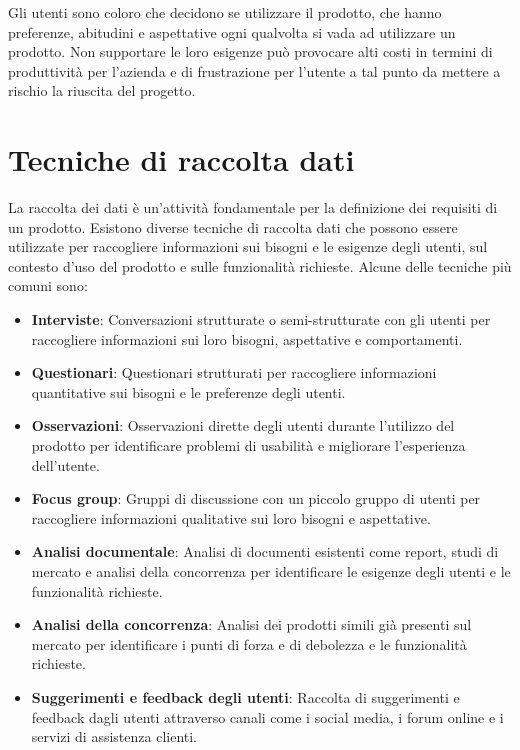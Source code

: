 \documentclass{report}
\begin{document}
	Gli utenti sono coloro che decidono se utilizzare il prodotto, che hanno preferenze, abitudini e aspettative ogni qualvolta si vada ad utilizzare un prodotto. Non supportare le loro esigenze può provocare alti costi in termini di produttività per l'azienda e di frustrazione per l'utente a tal punto da mettere a rischio la riuscita del progetto.

	\section{Tecniche di raccolta dati}
	La raccolta dei dati è un'attività fondamentale per la definizione dei requisiti di un prodotto. Esistono diverse tecniche di raccolta dati che possono essere utilizzate per raccogliere informazioni sui bisogni e le esigenze degli utenti, sul contesto d'uso del prodotto e sulle funzionalità richieste. Alcune delle tecniche più comuni sono:
	\begin{itemize}
		\item \textbf{Interviste}: Conversazioni strutturate o semi-strutturate con gli utenti per raccogliere informazioni sui loro bisogni, aspettative e comportamenti.
		\item \textbf{Questionari}: Questionari strutturati per raccogliere informazioni quantitative sui bisogni e le preferenze degli utenti.
		\item \textbf{Osservazioni}: Osservazioni dirette degli utenti durante l'utilizzo del prodotto per identificare problemi di usabilità e migliorare l'esperienza dell'utente.
		\item \textbf{Focus group}: Gruppi di discussione con un piccolo gruppo di utenti per raccogliere informazioni qualitative sui loro bisogni e aspettative.
		\item \textbf{Analisi documentale}: Analisi di documenti esistenti come report, studi di mercato e analisi della concorrenza per identificare le esigenze degli utenti e le funzionalità richieste.
		\item \textbf{Analisi della concorrenza}: Analisi dei prodotti simili già presenti sul mercato per identificare i punti di forza e di debolezza e le funzionalità richieste.
		\item \textbf{Suggerimenti e feedback degli utenti}: Raccolta di suggerimenti e feedback dagli utenti attraverso canali come i social media, i forum online e i servizi di assistenza clienti.
	\end{itemize}
\end{document}
